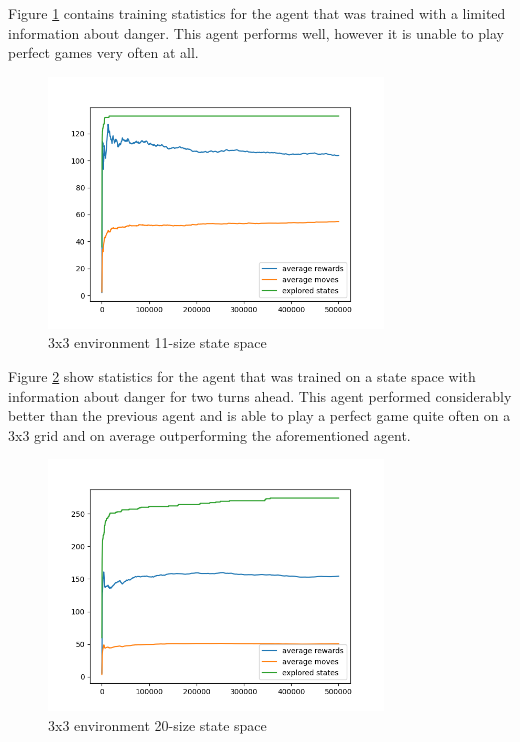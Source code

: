 \documentclass[lettersize,journal]{IEEEtran}
\begin{document}
Figure \ref{fig1} contains training statistics for the agent that was trained
with a limited information about danger. This agent performs well, however
it is unable to play perfect games very often at all.


\begin{figure}[!t]
\centering
\includegraphics[width=3.5in]{3_fig.png}
\caption{3x3 environment 11-size state space}
\label{fig1}
\end{figure}

Figure \ref{fig2} show statistics for the agent that was trained on a
state space with information about danger for two turns ahead.
This agent performed considerably better than the previous agent and
is able to play a perfect game quite often on a 3x3 grid and on average outperforming
the aforementioned agent.

\begin{figure}[!t]
\centering
\includegraphics[width=3.5in]{3-depth_fig.png}
\caption{3x3 environment 20-size state space}
\label{fig2}
\end{figure}
\end{document}
